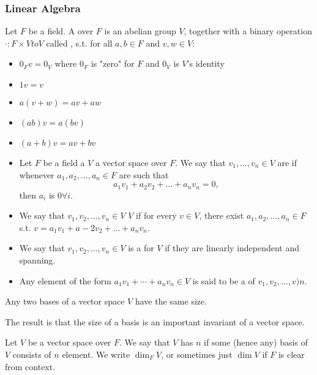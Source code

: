 \documentclass{scrartcl}
\begin{document}
\subsubsection{Linear Algebra}

\begin{definition}
	Let $F$ be a field. A  over $F$ is an abelian group $V$, together with a binary operation $\cdot : F \times V to V$ called , s.t. for all $a,b \in F$ and $v,w \in V$:
	\begin{itemize}
		\item $0_Fv = 0_V$ where $0_F$ is "zero" for $F$ and $0_V$ is $V$'s identity
		\item $1v = v$
		\item $a(v+w) = av+aw$
		\item $(ab)v = a(bv)$
		\item $(a+b)v = av+bv$
	\end{itemize}
\end{definition}

\begin{definition}
    \begin{itemize}
        \item Let $F$ be a field a $V$ a vector space over $F$. We say that $v_1, \dotsc, v_n \in V$ are  if whenever $a_1, a_2, \dotsc, a_n \in F$ are such that $$a_1v_1+a_2v_2 + \dotsc + a_nv_n = 0,$$ then $a_i$ is $0 \forall i$.
        \item We say that $v_1, v_2, \dotsc, v_n \in V$  $V$ if for every $v \in V$, there exist $a_1, a_2, \dotsc, a_n \in F$ s.t. $v = a_1v_1+a-2v_2 + \dotsc + a_nv_n$.
        \item We say that $v_1, v_2, \dotsc, v_n \in V$ is a  for $V$ if they are linearly independent and spanning.
        \item Any element of the form $a_1v_1 + \cdots + a_nv_n \in V$ is said to be a  of $v_1, v_2, \dotsc, v)n$.
    \end{itemize}
\end{definition}

\begin{theorem}
    Any two bases of a vector space $V$ have the same size.
\end{theorem}

The result is that the size of a basis is an important invariant of a vector space.

\begin{definition}
    Let $V$ be a vector space over $F$. We say that $V$ has  $n$ if some (hence any) basis of $V$ consists of $n$ element. We write $\dim_F V$, or sometimes just $\dim V$ if $F$ is clear from context.
\end{definition}
\end{document}
